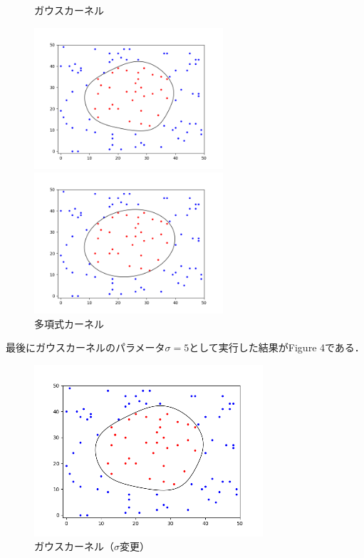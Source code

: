 \documentclass[11pt]{article}
\begin{document}
\begin{figure}[htpb]
    \begin{minipage}{0.50\hsize}
        \begin{center}
            \caption{ガウスカーネル}
            \includegraphics[width=70mm]{../results/gaussian_sigma=10_circle.png}
        \end{center}
    \end{minipage}
    \begin{minipage}{0.50\hsize}
        \begin{center}
            \caption{多項式カーネル}
            \includegraphics[width=70mm]{../results/poly_circle.png}
        \end{center}
    \end{minipage}
\end{figure}
最後にガウスカーネルのパラメータ$\sigma=5$として実行した結果がFigure 4である．\\
\begin{figure}[htbp]
    \begin{center}
        \caption{ガウスカーネル（$\sigma$変更）}
        \includegraphics[width=8.5cm]{../results/gaussian_sigma=5.png}
    \end{center}
\end{figure}
\end{document}
